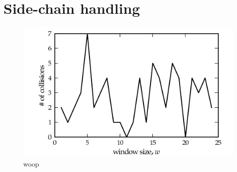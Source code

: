 \section{Side-chain handling}
\begin{figure}
	\centering
	\hspace*{-3.5mm}\includegraphics[width=1.1\columnwidth]{figures/plot_collisions}
	\caption{woop}
\end{figure}




